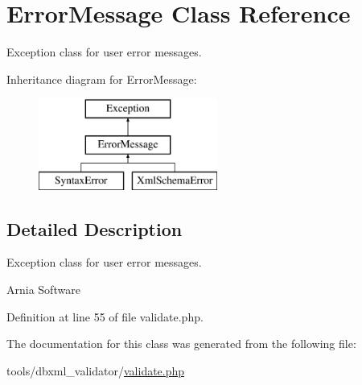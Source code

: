 \hypertarget{classErrorMessage}{\section{Error\+Message Class Reference}
\label{classErrorMessage}
}


Exception class for user error messages.  


Inheritance diagram for Error\+Message\+:\begin{figure}[H]
\begin{center}
\leavevmode
\includegraphics[height=3.000000cm]{classErrorMessage}
\end{center}
\end{figure}


\subsection{Detailed Description}
Exception class for user error messages. 

Arnia Software 

Definition at line 55 of file validate.\+php.



The documentation for this class was generated from the following file\+:\begin{DoxyCompactItemize}
\item 
tools/dbxml\+\_\+validator/\hyperlink{validate_8php}{validate.\+php}\end{DoxyCompactItemize}
